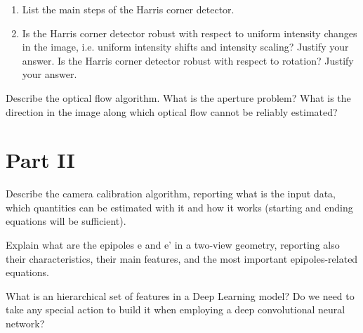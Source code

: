\documentclass[12pt]{article}
\begin{document}
    \begin{ejercicio}[6 points]
        \begin{enumerate}
            \item[a.] List the main steps of the Harris corner detector.
            \item[b.] Is the Harris corner detector robust with respect to uniform intensity changes in the image, i.e. uniform intensity shifts and intensity scaling? Justify your answer. Is the Harris corner detector robust with respect to rotation? Justify your answer.
        \end{enumerate}
    \end{ejercicio}

    \begin{ejercicio}[6 points]
        Describe the optical flow algorithm. What is the aperture problem? What is the direction in the image along which optical flow cannot be reliably estimated?
    \end{ejercicio}

    \section{Part II}

    \begin{ejercicio}[6 points]
        Describe the camera calibration algorithm, reporting what is the input data, which quantities can be estimated with it and how it works (starting and ending equations will be sufficient).
    \end{ejercicio}

    \begin{ejercicio}[6 points]
        Explain what are the epipoles e and e' in a two-view geometry, reporting also their characteristics, their main features, and the most important epipoles-related equations.
    \end{ejercicio}

    \begin{ejercicio}[4 points]
        What is an hierarchical set of features in a Deep Learning model? Do we need to take any special action to build it when employing a deep convolutional neural network?
    \end{ejercicio}
\end{document}
